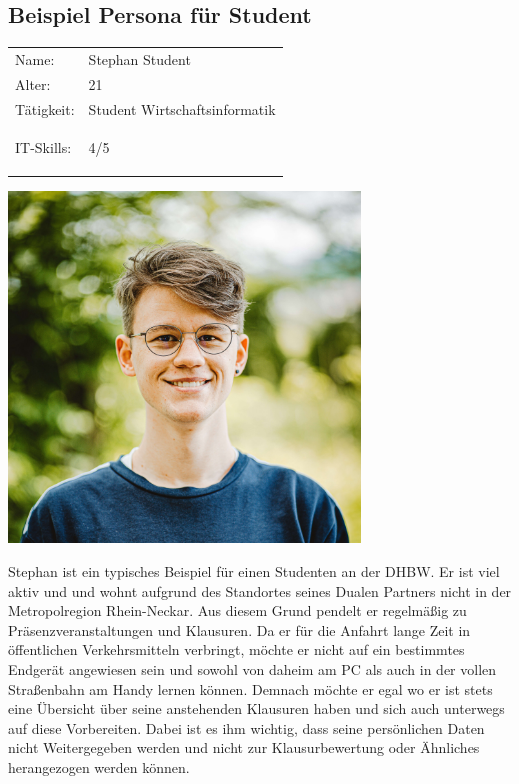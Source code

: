 \subsection{Beispiel Persona für Student}

\begin{minipage}[t]{0.5\textwidth}
	\vspace{-4cm}
	\renewcommand{\arraystretch}{1.5}
	\begin{tabular}{l l}
		Name: & Stephan Student \\
		Alter: & 21 \\
		Tätigkeit: & Student Wirtschaftsinformatik \\
		IT-Skills: & 4/5 \hspace{-1cm} \begin{barchart}{5.0}
			\baritemNL{}{4}
		\end{barchart} \\
	\end{tabular}
\end{minipage}
\hfill
\begin{minipage}[t]{0.4\textwidth}
	\flushright
	\includegraphics[width=0.70\textwidth]{img/carlos-lindner-ZVo7vtXilCs-unsplash.jpg}
\end{minipage}

Stephan ist ein typisches Beispiel für einen Studenten an der DHBW.
Er ist viel aktiv und und wohnt aufgrund des Standortes seines Dualen Partners nicht in der Metropolregion Rhein-Neckar. Aus diesem Grund pendelt er regelmäßig zu Präsenzveranstaltungen und Klausuren. Da er für die Anfahrt lange Zeit in öffentlichen Verkehrsmitteln verbringt, möchte er nicht auf ein bestimmtes Endgerät angewiesen sein und sowohl von daheim am PC als auch in der vollen Straßenbahn am Handy lernen können.  Demnach möchte er egal wo er ist stets eine Übersicht über seine anstehenden Klausuren haben und sich auch unterwegs auf diese Vorbereiten. Dabei ist es ihm wichtig, dass seine persönlichen Daten nicht Weitergegeben werden und nicht zur Klausurbewertung oder Ähnliches herangezogen werden können.

